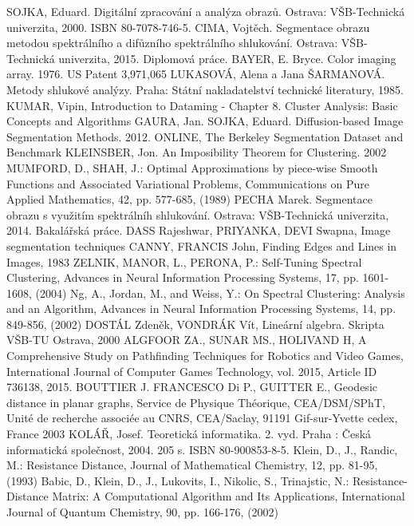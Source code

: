 \documentclass[czech, master, public, dept460, male, cpdeclaration, oneside]{diploma}
\begin{document}
\pagestyle{plain}
\begin{thebibliography}{99}	
	SOJKA, Eduard. Digitální zpracování a analýza obrazů. Ostrava: VŠB-Technická univerzita, 2000. ISBN 80-7078-746-5.
	CIMA, Vojtěch. Segmentace obrazu metodou spektrálního a difůzního spektrálního shlukování. Ostrava: VŠB-Technická univerzita, 2015. Diplomová práce.
	BAYER, E. Bryce. Color imaging array. 1976. US Patent 3,971,065
	 LUKASOVÁ, Alena a Jana ŠARMANOVÁ. Metody shlukové analýzy. Praha: Státní nakladatelství technické literatury, 1985.
	 KUMAR, Vipin, Introduction to Dataming - Chapter 8. Cluster Analysis: Basic Concepts and Algorithms
	 GAURA, Jan. SOJKA, Eduard. Diffusion-based Image Segmentation Methods. 2012.
	 ONLINE, The Berkeley Segmentation Dataset and Benchmark
	 KLEINSBER, Jon. An Imposibility Theorem for Clustering. 2002
	 MUMFORD, D., SHAH, J.: Optimal Approximations by piece-wise Smooth Functions and Associated Variational Problems, Communications on Pure Applied Mathematics, 42, pp. 577-685, (1989) 
	PECHA Marek. Segmentace obrazu s využitím spektrálníh shlukování. Ostrava: VŠB-Technická univerzita, 2014. Bakalářská práce.
	 DASS Rajeshwar, PRIYANKA, DEVI Swapna, Image segmentation techniques
	 CANNY, FRANCIS John, Finding Edges and Lines in Images, 1983
	 ZELNIK, MANOR, L., PERONA, P.: Self-Tuning Spectral Clustering, Advances in Neural Information Processing Systems, 17, pp. 1601-1608, (2004)
	 Ng, A., Jordan, M., and Weiss, Y.: On Spectral Clustering: Analysis and an Algorithm, Advances in Neural Information Processing Systems, 14, pp. 849-856, (2002)
	DOSTÁL Zdeněk, VONDRÁK Vít, Lineární algebra. Skripta VŠB-TU Ostrava, 2000
	ALGFOOR ZA., SUNAR MS., HOLIVAND H, A Comprehensive Study on Pathfinding Techniques for Robotics and Video Games, International Journal of Computer Games Technology, vol. 2015, Article ID 736138, 2015.
	 BOUTTIER J. FRANCESCO Di P., GUITTER E., Geodesic distance in planar graphs, Service de Physique Théorique, CEA/DSM/SPhT, Unité de recherche associée au CNRS, CEA/Saclay, 91191 Gif-sur-Yvette cedex, France 2003
	 KOLÁŘ, Josef. Teoretická informatika. 2. vyd. Praha : Česká informatická společnost, 2004. 205 s. ISBN 80-900853-8-5.
	 Klein, D., J., Randic, M.: Resistance Distance, Journal of Mathematical Chemistry, 12, pp. 81-95, (1993)
	 Babic, D., Klein, D., J., Lukovits, I., Nikolic, S., Trinajstic, N.: Resistance-Distance Matrix: A Computational Algorithm and Its Applications, International Journal of Quantum Chemistry, 90, pp. 166-176, (2002)
\end{thebibliography}
\end{document}
